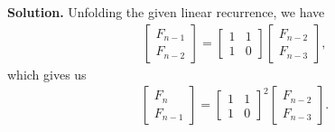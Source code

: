\documentclass[11pt]{article}
\begin{document}
\begin{enumerate}
\begin{enumerate}
\textbf{Solution.} Unfolding the given linear recurrence, we have  
\begin{align*}
  \begin{bmatrix}
    F_{n-1} \\ 
  F_{n-2}
\end{bmatrix} = \begin{bmatrix}
    1&1\\
    1 & 0
  \end{bmatrix}
\begin{bmatrix}
    F_{n-2} \\ 
  F_{n-3}
\end{bmatrix},
\end{align*}
which gives us 
\begin{align*}
  \begin{bmatrix}
    F_{n} \\ 
  F_{n-1}
  \end{bmatrix} =
  \begin{bmatrix}
    1&1\\
    1 & 0
  \end{bmatrix}^{2}
\begin{bmatrix}
    F_{n-2} \\ 
  F_{n-3}
\end{bmatrix}.
\end{align*}


\end{enumerate}
\end{enumerate}
\end{document}
